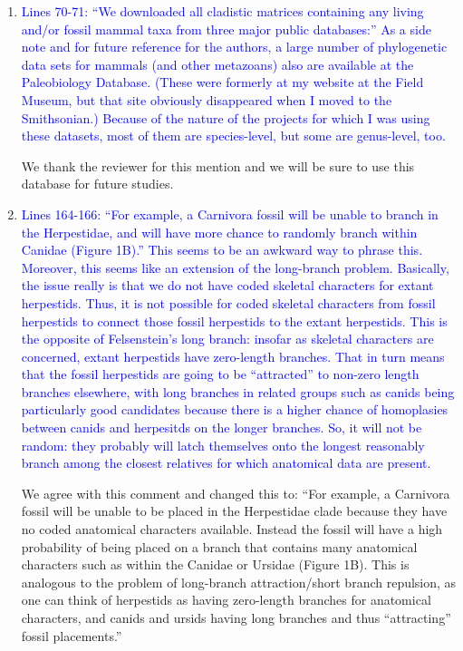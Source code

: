 \documentclass[12pt,letterpaper]{article}
\begin{document}
\begin{enumerate}
\item{\textcolor{blue}{Lines 70-71: ``We downloaded all cladistic matrices containing any living and/or fossil mammal  taxa from three major public databases:''
As a side note and for future reference for the authors, a large number of phylogenetic data sets for mammals (and other metazoans) also are available at the Paleobiology Database.
(These were formerly at my website at the Field Museum, but that site obviously disappeared when I moved to the Smithsonian.)
Because of the nature of the projects for which I was using these datasets, most of them are species-level, but some are genus-level, too.}}

We thank the reviewer for this mention and we will be sure to use this database for future studies.

\item{\textcolor{blue}{Lines 164-166: ``For example, a Carnivora fossil will be unable to branch in the Herpestidae, and will have more chance to randomly branch within Canidae (Figure 1B).'' 
This seems to be an awkward way to phrase this.
Moreover, this seems like an extension of the long-branch problem.
Basically, the issue really is that we do not have coded skeletal characters for extant herpestids.
Thus, it is not possible for coded skeletal characters from fossil herpestids to connect those fossil herpestids to the extant herpestids.
This is the opposite of Felsenstein's long branch: insofar as skeletal characters are concerned, extant herpestids have zero-length branches.
That in turn means that the fossil herpestids are going to be ``attracted'' to non-zero length branches elsewhere, with long branches in related groups such as canids being particularly good candidates because there is a higher chance of homoplasies between canids and herpesitds on the longer branches.
So, it will not be random: they probably will latch themselves onto the longest reasonably branch among the closest relatives for which anatomical data are present.}}

We agree with this comment and changed this to:
``For example, a Carnivora fossil will be unable to be placed in the Herpestidae clade because they have no coded anatomical characters available.
Instead the fossil will have a high probability of being placed on a branch that contains many anatomical characters such as within the Canidae or Ursidae (Figure 1B). 
This is analogous to the problem of long-branch attraction/short branch repulsion, as one can think of herpestids as having zero-length branches for anatomical characters, and canids and ursids having long branches and thus ``attracting'' fossil placements.''

\end{enumerate}
\end{document}
